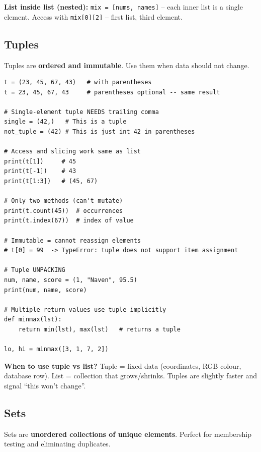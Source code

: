 \documentclass[12pt,a4paper]{article}
\newcommand{\code}[1]{\texttt{\small\color{pyblue}#1}}
\begin{document}
\begin{notebox}
\textbf{List inside list (nested):} \code{mix = [nums, names]} -- each inner list is a single element. Access with \code{mix[0][2]} -- first list, third element.
\end{notebox}

\subsection{Tuples}

Tuples are \textbf{ordered and immutable}. Use them when data should not change.

\begin{lstlisting}
t = (23, 45, 67, 43)   # with parentheses
t = 23, 45, 67, 43     # parentheses optional -- same result

# Single-element tuple NEEDS trailing comma
single = (42,)   # This is a tuple
not_tuple = (42) # This is just int 42 in parentheses

# Access and slicing work same as list
print(t[1])     # 45
print(t[-1])    # 43
print(t[1:3])   # (45, 67)

# Only two methods (can't mutate)
print(t.count(45))  # occurrences
print(t.index(67))  # index of value

# Immutable = cannot reassign elements
# t[0] = 99  -> TypeError: tuple does not support item assignment

# Tuple UNPACKING
num, name, score = (1, "Naven", 95.5)
print(num, name, score)

# Multiple return values use tuple implicitly
def minmax(lst):
    return min(lst), max(lst)   # returns a tuple

lo, hi = minmax([3, 1, 7, 2])
\end{lstlisting}

\begin{tipbox}
\textbf{When to use tuple vs list?} Tuple = fixed data (coordinates, RGB colour, database row). List = collection that grows/shrinks. Tuples are slightly faster and signal ``this won't change''.
\end{tipbox}

\subsection{Sets}

Sets are \textbf{unordered collections of unique elements}. Perfect for membership testing and eliminating duplicates.
\end{document}
